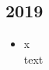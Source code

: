 \subsection*{2019}
\begin{history}


    \begin{itemize}

        \item x\\
              text

    \end{itemize}

\end{history}
